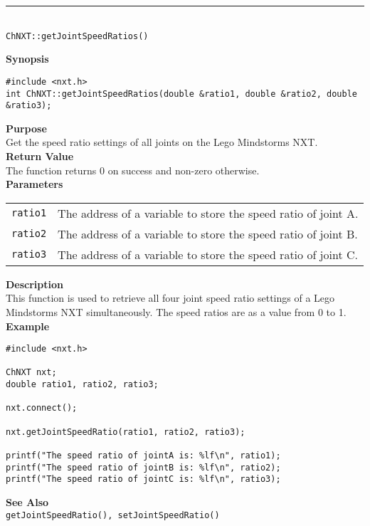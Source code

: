 \noindent
\vspace{5pt}
\rule{4.5in}{0.015in}\\
\noindent
{\LARGE \texttt{ChNXT::getJointSpeedRatios()}}\\
{}

\noindent
{\bf Synopsis}
\begin{lstlisting}
#include <nxt.h>
int ChNXT::getJointSpeedRatios(double &ratio1, double &ratio2, double &ratio3);
\end{lstlisting}

\noindent
{\bf Purpose}\\
Get the speed ratio settings of all joints on the Lego Mindstorms NXT.\\

\noindent
{\bf Return Value}\\
The function returns 0 on success and non-zero otherwise.\\

\noindent
{\bf Parameters}
\vspace{-0.1in}
\begin{description}
\item               
\begin{tabular}{p{10 mm}p{145 mm}}
\texttt{ratio1} & The address of a variable to store the speed ratio of joint A.\\
\texttt{ratio2} & The address of a variable to store the speed ratio of joint B.\\
\texttt{ratio3} & The address of a variable to store the speed ratio of joint C.\\
\end{tabular}
\end{description}

\noindent
{\bf Description}\\
This function is used to retrieve all four joint speed ratio settings of a Lego
Mindstorms NXT simultaneously. The speed ratios are as a value from 0 to 1. \\

\noindent
{\bf Example}
\begin{lstlisting}
#include <nxt.h>

ChNXT nxt;
double ratio1, ratio2, ratio3;

nxt.connect();

nxt.getJointSpeedRatio(ratio1, ratio2, ratio3);

printf("The speed ratio of jointA is: %lf\n", ratio1);
printf("The speed ratio of jointB is: %lf\n", ratio2);
printf("The speed ratio of jointC is: %lf\n", ratio3);
\end{lstlisting}

\noindent
{\bf See Also}\\
\texttt{getJointSpeedRatio(), setJointSpeedRatio()}

